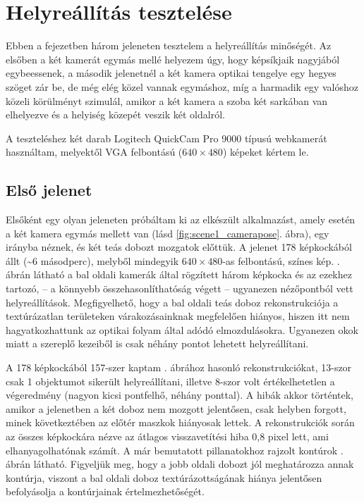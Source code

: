 \chapter{Helyreállítás tesztelése \label{chapter:full-test}}

Ebben a fejezetben három jeleneten tesztelem a helyreállítás minőségét. Az elsőben a két kamerát egymás mellé helyezem úgy, hogy képsíkjaik nagyjából egybeessenek, a második jelenetnél a két kamera optikai tengelye egy hegyes szöget zár be, de még elég közel vannak egymáshoz, míg a harmadik egy valóshoz közeli körülményt szimulál, amikor a két kamera a szoba két sarkában van elhelyezve és a helyiség közepét veszik két oldalról.

A teszteléshez két darab Logitech QuickCam Pro 9000 típusú webkamerát használtam, melyektől VGA felbontású ($640\times 480$) képeket kértem le.

\section{Első jelenet}

Elsőként egy olyan jeleneten próbáltam ki az elkészült alkalmazást, amely esetén a két kamera egymás mellett van (lásd \ref{fig:scene1_camerapose}. ábra), egy irányba néznek, és két teás dobozt mozgatok előttük. A jelenet 178 képkockából állt (\textasciitilde 6 másodperc), melyből mindegyik $640\times 480$-as felbontású, színes kép. . ábrán látható a bal oldali kamerák által rögzített három képkocka és az ezekhez tartozó, -- a könnyebb összehasonlíthatóság végett -- ugyanezen nézőpontból vett helyreállítások. Megfigyelhető, hogy a bal oldali teás doboz rekonstrukciója a textúrázatlan területeken várakozásainknak megfelelően hiányos, hiszen itt nem hagyatkozhattunk az optikai folyam által adódó elmozdulásokra. Ugyanezen okok miatt a szereplő kezeiből is csak néhány pontot lehetett helyreállítani.

A 178 képkockából 157-szer kaptam . ábrához hasonló rekonstrukciókat, 13-szor csak 1 objektumot sikerült helyreállítani, illetve 8-szor volt értékelhetetlen a végeredmény (nagyon kicsi pontfelhő, néhány ponttal). A hibák akkor történtek, amikor a jelenetben a két doboz nem mozgott jelentősen, csak helyben forgott, minek következtében az előtér maszkok hiányosak lettek. A rekonstrukciók során az összes képkockára nézve az átlagos visszavetítési hiba 0,8 pixel lett, ami elhanyagolhatónak számít. A már bemutatott pillanatokhoz rajzolt kontúrok . ábrán látható. Figyeljük meg, hogy a jobb oldali dobozt jól meghatározza annak kontúrja, viszont a bal oldali doboz textúrázottságának hiánya jelentősen befolyásolja a kontúrjainak értelmezhetőségét.


